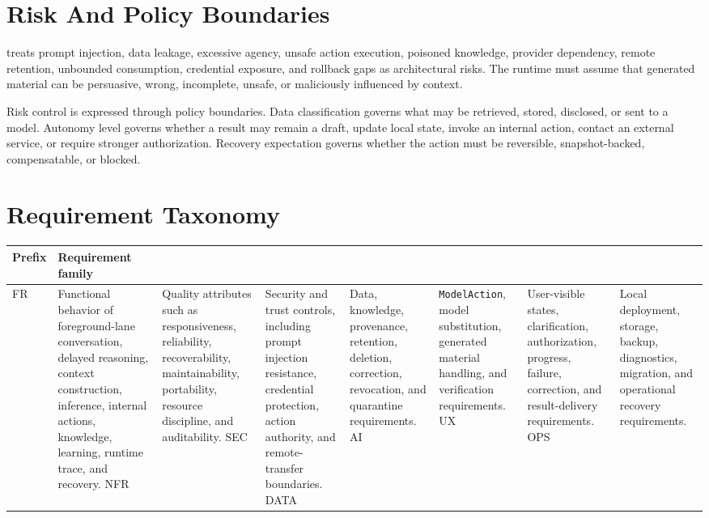 \section{Risk And Policy Boundaries}

\Madre treats prompt injection, data leakage, excessive agency, unsafe action execution, poisoned knowledge, provider dependency, remote retention, unbounded consumption, credential exposure, and rollback gaps as architectural risks. The runtime must assume that generated material can be persuasive, wrong, incomplete, unsafe, or maliciously influenced by context.

Risk control is expressed through policy boundaries. Data classification governs what may be retrieved, stored, disclosed, or sent to a model. Autonomy level governs whether a result may remain a draft, update local state, invoke an internal action, contact an external service, or require stronger authorization. Recovery expectation governs whether the action must be reversible, snapshot-backed, compensatable,
or blocked.


\section{Requirement Taxonomy}

\begin{tabularx}{.95\linewidth}{@{}lX@{}}
	\toprule
	\textbf{Prefix} & \textbf{Requirement family} \\
	\midrule
	FR & Functional behavior of foreground-lane conversation, delayed reasoning, context construction, inference, internal actions, knowledge, learning, runtime trace, and recovery. \N
	NFR & Quality attributes such as responsiveness, reliability, recoverability, maintainability, portability, resource discipline, and auditability. \N
	SEC & Security and trust controls, including prompt injection resistance, credential protection, action authority, and remote-transfer boundaries. \N
	DATA & Data, knowledge, provenance, retention, deletion, correction, revocation, and quarantine requirements. \N
	AI & \texttt{ModelAction}, model substitution, generated material handling, and verification requirements. \N
	UX & User-visible states, clarification, authorization, progress, failure, correction, and result-delivery requirements. \N
	OPS & Local deployment, storage, backup, diagnostics, migration, and operational recovery requirements. \\
	\bottomrule
\end{tabularx}
\newpage

